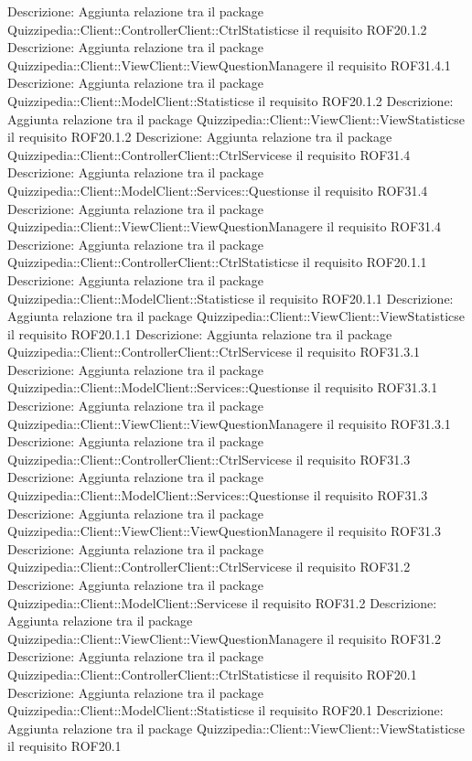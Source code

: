 Descrizione: Aggiunta relazione tra il package Quizzipedia::Client::ControllerClient::CtrlStatisticse il requisito ROF20.1.2 
Descrizione: Aggiunta relazione tra il package Quizzipedia::Client::ViewClient::ViewQuestionManagere il requisito ROF31.4.1 
Descrizione: Aggiunta relazione tra il package Quizzipedia::Client::ModelClient::Statisticse il requisito ROF20.1.2 
Descrizione: Aggiunta relazione tra il package Quizzipedia::Client::ViewClient::ViewStatisticse il requisito ROF20.1.2 
Descrizione: Aggiunta relazione tra il package Quizzipedia::Client::ControllerClient::CtrlServicese il requisito ROF31.4 
Descrizione: Aggiunta relazione tra il package Quizzipedia::Client::ModelClient::Services::Questionse il requisito ROF31.4 
Descrizione: Aggiunta relazione tra il package Quizzipedia::Client::ViewClient::ViewQuestionManagere il requisito ROF31.4 
Descrizione: Aggiunta relazione tra il package Quizzipedia::Client::ControllerClient::CtrlStatisticse il requisito ROF20.1.1 
Descrizione: Aggiunta relazione tra il package Quizzipedia::Client::ModelClient::Statisticse il requisito ROF20.1.1 
Descrizione: Aggiunta relazione tra il package Quizzipedia::Client::ViewClient::ViewStatisticse il requisito ROF20.1.1 
Descrizione: Aggiunta relazione tra il package Quizzipedia::Client::ControllerClient::CtrlServicese il requisito ROF31.3.1 
Descrizione: Aggiunta relazione tra il package Quizzipedia::Client::ModelClient::Services::Questionse il requisito ROF31.3.1 
Descrizione: Aggiunta relazione tra il package Quizzipedia::Client::ViewClient::ViewQuestionManagere il requisito ROF31.3.1 
Descrizione: Aggiunta relazione tra il package Quizzipedia::Client::ControllerClient::CtrlServicese il requisito ROF31.3 
Descrizione: Aggiunta relazione tra il package Quizzipedia::Client::ModelClient::Services::Questionse il requisito ROF31.3 
Descrizione: Aggiunta relazione tra il package Quizzipedia::Client::ViewClient::ViewQuestionManagere il requisito ROF31.3 
Descrizione: Aggiunta relazione tra il package Quizzipedia::Client::ControllerClient::CtrlServicese il requisito ROF31.2 
Descrizione: Aggiunta relazione tra il package Quizzipedia::Client::ModelClient::Servicese il requisito ROF31.2 
Descrizione: Aggiunta relazione tra il package Quizzipedia::Client::ViewClient::ViewQuestionManagere il requisito ROF31.2 
Descrizione: Aggiunta relazione tra il package Quizzipedia::Client::ControllerClient::CtrlStatisticse il requisito ROF20.1 
Descrizione: Aggiunta relazione tra il package Quizzipedia::Client::ModelClient::Statisticse il requisito ROF20.1 
Descrizione: Aggiunta relazione tra il package Quizzipedia::Client::ViewClient::ViewStatisticse il requisito ROF20.1 
